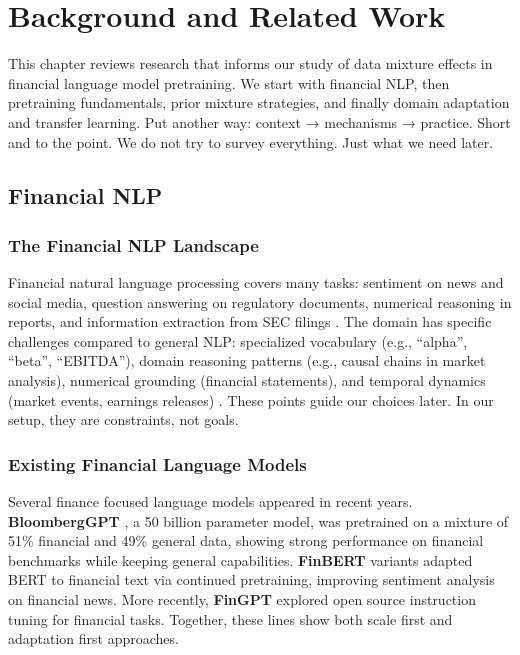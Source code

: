\chapter{Background and Related Work}

This chapter reviews research that informs our study of data mixture effects in financial language model pretraining. We start with financial NLP, then pretraining fundamentals, prior mixture strategies, and finally domain adaptation and transfer learning. Put another way: context → mechanisms → practice. Short and to the point. We do not try to survey everything. Just what we need later.

\section{Financial NLP}

\subsection{The Financial NLP Landscape}

Financial natural language processing covers many tasks: sentiment on news and social media, question answering on regulatory documents, numerical reasoning in reports, and information extraction from SEC filings \parencite{araci2019finbert, chen2021finqa}. The domain has specific challenges compared to general NLP: specialized vocabulary (e.g., ``alpha'', ``beta'', ``EBITDA''), domain reasoning patterns (e.g., causal chains in market analysis), numerical grounding (financial statements), and temporal dynamics (market events, earnings releases) \parencite{wu2023bloomberggpt, araci2019finbert}. These points guide our choices later. In our setup, they are constraints, not goals.

\subsection{Existing Financial Language Models}

Several finance focused language models appeared in recent years. \textbf{BloombergGPT} \parencite{wu2023bloomberggpt}, a 50 billion parameter model, was pretrained on a mixture of 51\% financial and 49\% general data, showing strong performance on financial benchmarks while keeping general capabilities. \textbf{FinBERT} variants \parencite{araci2019finbert, yang2020finbert} adapted BERT to financial text via continued pretraining, improving sentiment analysis on financial news. More recently, \textbf{FinGPT} \parencite{yang2023fingpt} explored open source instruction tuning for financial tasks. Together, these lines show both scale first and adaptation first approaches.

